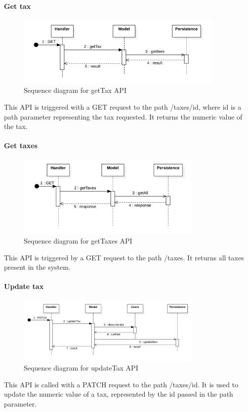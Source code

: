 \paragraph*{Get tax}
\begin{figure}[H]
    \includegraphics[width=0.9\textwidth]{res/images/sequence-diagrams/taxes/getTax.png}
    \caption{Sequence diagram for getTax API}
\end{figure}
This API is triggered with a GET request to the path /taxes/{id}, where id is a path parameter representing the tax requested. It returns the numeric value of the tax.

\paragraph*{Get taxes}
\begin{figure}[H]
    \includegraphics[width=0.8\textwidth]{res/images/sequence-diagrams/taxes/getTaxes.png}
    \caption{Sequence diagram for getTaxes API}
\end{figure}
This API is triggered by a GET request to the path /taxes. It returns all taxes present in the system.

\paragraph*{Update tax}
\begin{figure}[H]
    \includegraphics[width=0.8\textwidth]{res/images/sequence-diagrams/taxes/updateTax.png}
    \caption{Sequence diagram for updateTax API}
\end{figure}
This API is called with a PATCH request to the path /taxes/{id}. It is used to update the numeric value of a tax, represented by the id passed in the path parameter.

